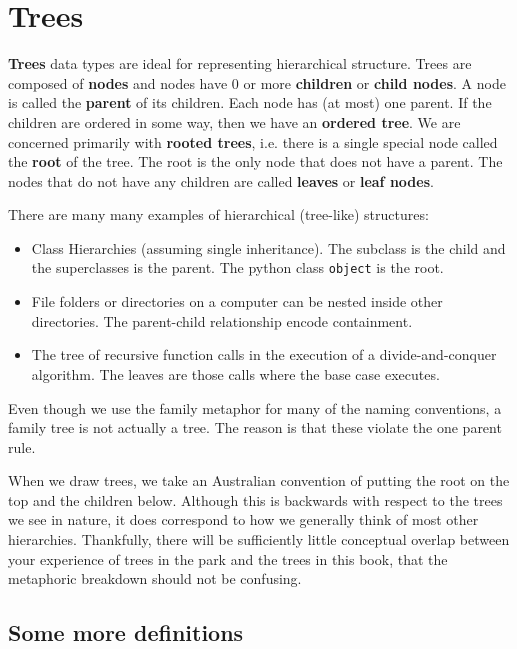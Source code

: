 \chapter{Trees}


\textbf{Trees} data types are ideal for representing hierarchical structure.
Trees are composed of \textbf{nodes} and nodes have $0$ or more \textbf{children} or \textbf{child nodes}.
A node is called the \textbf{parent} of its children.
Each node has (at most) one parent.
If the children are ordered in some way, then we have an \textbf{ordered tree}.
We are concerned primarily with \textbf{rooted trees}, i.e. there is a single special node called the \textbf{root} of the tree.
The root is the only node that does not have a parent.
The nodes that do not have any children are called \textbf{leaves} or \textbf{leaf nodes}.


There are many many examples of hierarchical (tree-like) structures:

\begin{itemize}

\item Class Hierarchies (assuming single inheritance).  The subclass is the child and the superclasses is the parent.  The python class \texttt{object} is the root.

\item File folders or directories on a computer can be nested inside other directories.  The parent-child relationship encode containment.

\item The tree of recursive function calls in the execution of a divide-and-conquer algorithm.  The leaves are those calls where the base case executes.

\end{itemize}

Even though we use the family metaphor for many of the naming conventions, a family tree is not actually a tree.  The reason is that these violate the one parent rule.


When we draw trees, we take an Australian convention of putting the root on the top and the children below.  Although this is backwards with respect to the trees we see in nature, it does correspond to how we generally think of most other hierarchies.
Thankfully, there will be sufficiently little conceptual overlap between your experience of trees in the park and the trees in this book, that the metaphoric breakdown should not be confusing.

\section{Some more definitions}


